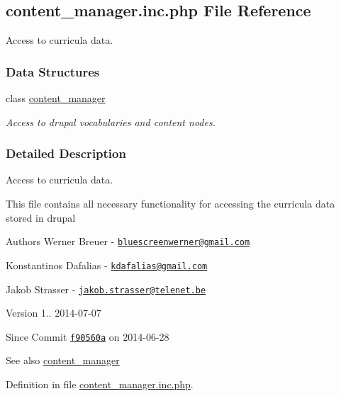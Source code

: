\hypertarget{content__manager_8inc_8php}{\subsection{content\+\_\+manager.\+inc.\+php File Reference}
\label{content__manager_8inc_8php}
}


Access to curricula data.  


\subsubsection*{Data Structures}
\begin{DoxyCompactItemize}
\item 
class \hyperlink{classcontent__manager}{content\+\_\+manager}
\begin{DoxyCompactList}\small\item\em Access to drupal vocabularies and content nodes. \end{DoxyCompactList}\end{DoxyCompactItemize}


\subsubsection{Detailed Description}
Access to curricula data. 

This file contains all necessary functionality for accessing the curricula data stored in drupal

\begin{DoxyAuthor}{Authors}
Werner Breuer -\/ \href{mailto:bluescreenwerner@gmail.com}{\tt bluescreenwerner@gmail.\+com} 

Konstantinos Dafalias -\/ \href{mailto:kdafalias@gmail.com}{\tt kdafalias@gmail.\+com} 

Jakob Strasser -\/ \href{mailto:jakob.strasser@telenet.be}{\tt jakob.\+strasser@telenet.\+be} 
\end{DoxyAuthor}
\begin{DoxyVersion}{Version}
1.. 2014-\/07-\/07 
\end{DoxyVersion}
\begin{DoxySince}{Since}
Commit \href{http://github.com/TheJake123/DrupalModul/commit/f90560aa796b39853beb42a521d6d94c86051c46}{\tt f90560a} on 2014-\/06-\/28
\end{DoxySince}
\begin{DoxySeeAlso}{See also}
\hyperlink{classcontent__manager}{content\+\_\+manager} 
\end{DoxySeeAlso}


Definition in file \hyperlink{content__manager_8inc_8php_source}{content\+\_\+manager.\+inc.\+php}.

